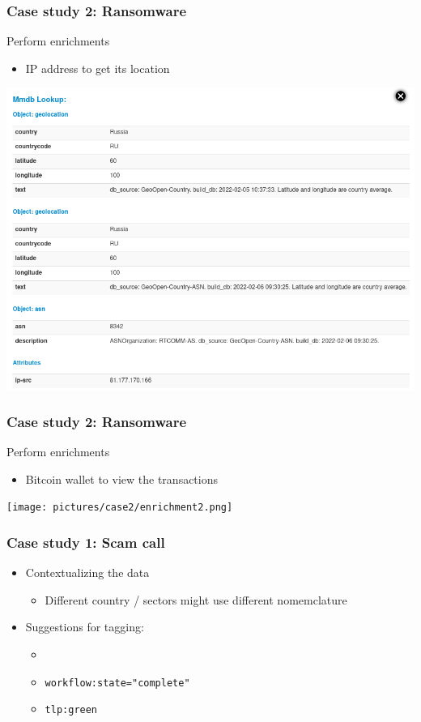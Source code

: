 \begin{frame}
    \frametitle{Case study 2: Ransomware}
    Perform enrichments
    \begin{itemize}
        \item IP address to get its location
    \end{itemize}
    \includegraphics[width=1.0\linewidth]{pictures/case2/enrichment1.png}
\end{frame}

\begin{frame}
    \frametitle{Case study 2: Ransomware}
    Perform enrichments
    \begin{itemize}
        \item Bitcoin wallet to view the transactions
    \end{itemize}
    \texttt{[image: pictures/case2/enrichment2.png]}
\end{frame}

\begin{frame}
    \frametitle{Case study 1: Scam call}
    \begin{itemize}
        \item Contextualizing the data
        \begin{itemize}
            \item Different country / sectors might use different nomemclature
        \end{itemize}
        \item Suggestions for tagging:
        \begin{itemize}
            \item 
            \item \texttt{workflow:state="complete"}
            \item \texttt{tlp:green}
        \end{itemize}
    \end{itemize}
\end{frame}